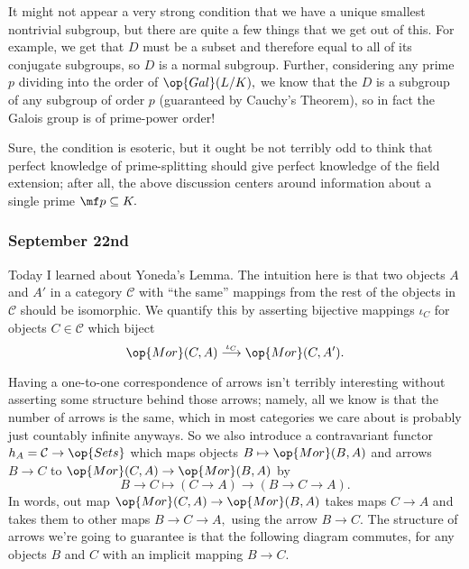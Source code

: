 It might not appear a very strong condition that we have a unique smallest nontrivial subgroup, but there are quite a few things that we get out of this. For example, we get that $D$ must be a subset and therefore equal to all of its conjugate subgroups, so $D$ is a normal subgroup. Further, considering any prime $p$ dividing into the order of $\op{Gal}(L/K),$ we know that the $D$ is a subgroup of any subgroup of order $p$ (guaranteed by Cauchy's Theorem), so in fact the Galois group is of prime-power order!

Sure, the condition is esoteric, but it ought be not terribly odd to think that perfect knowledge of prime-splitting should give perfect knowledge of the field extension; after all, the above discussion centers around information about a single prime $\mf p\subseteq K.$

\subsubsection{September 22nd}
Today I learned about Yoneda's Lemma. The intuition here is that two objects $A$ and $A'$ in a category $\mathcal C$ with ``the same'' mappings from the rest of the objects in $\mathcal C$ should be isomorphic. We quantify this by asserting bijective mappings $\iota_C$ for objects $C\in\mathcal C$ which biject
\[\op{Mor}(C,A)\stackrel{\iota_C}\longrightarrow\op{Mor}(C,A').\]

Having a one-to-one correspondence of arrows isn't terribly interesting without asserting some structure behind those arrows; namely, all we know is that the number of arrows is the same, which in most categories we care about is probably just countably infinite anyways. So we also introduce a contravariant functor $h_A=\mathcal C\to\op{Sets}$ which maps objects $B\mapsto\op{Mor}(B,A)$ and arrows $B\to C$ to $\op{Mor}(C,A)\to\op{Mor}(B,A)$ by
\[B\to C\longmapsto (C\to A)\to(B\to C\to A).\]
In words, out map $\op{Mor}(C,A)\to\op{Mor}(B,A)$ takes maps $C\to A$ and takes them to other maps $B\to C\to A,$ using the arrow $B\to C.$ The structure of arrows we're going to guarantee is that the following diagram commutes, for any objects $B$ and $C$ with an implicit mapping $B\to C.$
\begin{center}
\end{center}

